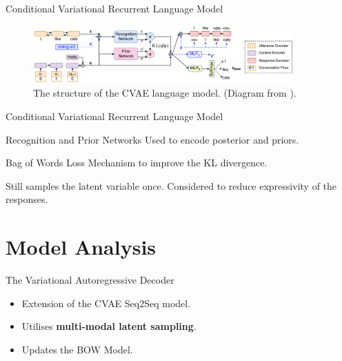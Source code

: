 \documentclass[aspectratio=169, 11pt]{beamer}
\begin{document}
\begin{frame}{Conditional Variational Recurrent Language Model}
  \begin{figure}[!ht]
    \centering
    \includegraphics[width=100mm]{diagrams/cvae_seq2seq.png}
    \caption{The structure of the CVAE language model. (Diagram from \cite{zhao_learning_2017}). \label{cvae_seq2seq}}
  \end{figure}
\end{frame}

\begin{frame}{Conditional Variational Recurrent Language Model}
  \begin{block}{Recognition and Prior Networks}
    Used to encode posterior and priors.
  \end{block}
  \begin{block}{Bag of Words Loss}
    Mechanism to improve the KL divergence.
  \end{block}
  \begin{block}{Still samples the latent variable once.}
    Considered to reduce expressivity of the responses.
  \end{block}
\end{frame}

\section{Model Analysis}
\begin{frame}{The Variational Autoregressive Decoder}
  \begin{itemize}
    \item Extension of the CVAE Seq2Seq model.
    \item Utilises \textbf{multi-modal latent sampling}.
    \item Updates the BOW Model.
  \end{itemize}
\end{frame}
\end{document}
